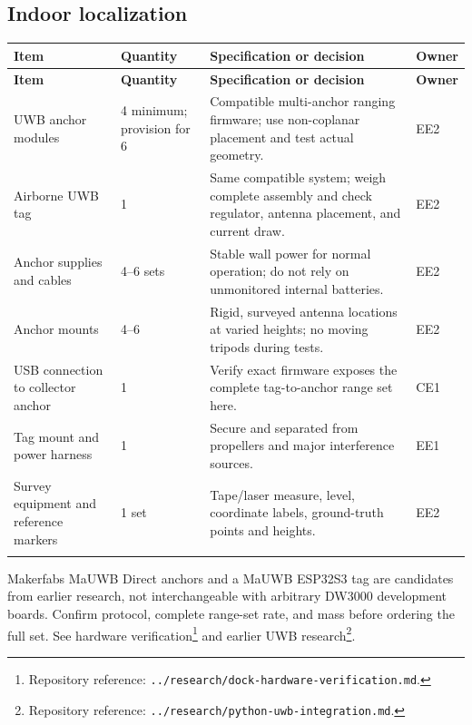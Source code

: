 \documentclass[10pt,letterpaper]{article}
\begin{document}
\subsection{Indoor localization}
\begingroup\small\begin{longtable}{P{1.562in}P{0.781in}P{3.383in}P{0.781in}}
\toprule{}\textbf{Item} & \textbf{Quantity} & \textbf{Specification or decision} & \textbf{Owner} \\\midrule\endfirsthead
\toprule{}\textbf{Item} & \textbf{Quantity} & \textbf{Specification or decision} & \textbf{Owner} \\\midrule\endhead
\bottomrule\endfoot
UWB anchor modules & 4 minimum; provision for 6 & Compatible multi-anchor ranging firmware; use non-coplanar placement and test actual geometry. & EE2 \\ \addlinespace[2pt]
Airborne UWB tag & 1 & Same compatible system; weigh complete assembly and check regulator, antenna placement, and current draw. & EE2 \\ \addlinespace[2pt]
Anchor supplies and cables & 4--6 sets & Stable wall power for normal operation; do not rely on unmonitored internal batteries. & EE2 \\ \addlinespace[2pt]
Anchor mounts & 4--6 & Rigid, surveyed antenna locations at varied heights; no moving tripods during tests. & EE2 \\ \addlinespace[2pt]
USB connection to collector anchor & 1 & Verify exact firmware exposes the complete tag-to-anchor range set here. & CE1 \\ \addlinespace[2pt]
Tag mount and power harness & 1 & Secure and separated from propellers and major interference sources. & EE1 \\ \addlinespace[2pt]
Survey equipment and reference markers & 1 set & Tape/laser measure, level, coordinate labels, ground-truth points and heights. & EE2 \\ \addlinespace[2pt]
\end{longtable}\endgroup
Makerfabs MaUWB Direct anchors and a MaUWB ESP32S3 tag are candidates from earlier research, not interchangeable with arbitrary DW3000 development boards. Confirm protocol, complete range-set rate, and mass before ordering the full set. See hardware verification\footnote{Repository reference: \nolinkurl{../research/dock-hardware-verification.md}.} and earlier UWB research\footnote{Repository reference: \nolinkurl{../research/python-uwb-integration.md}.}.
\end{document}
